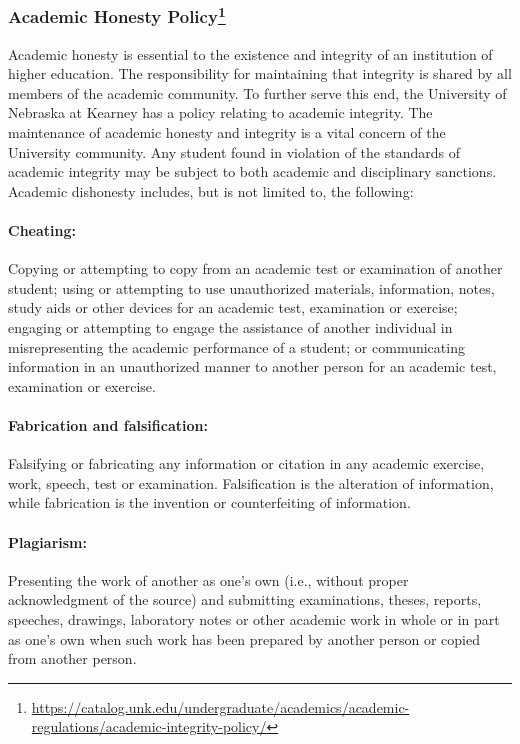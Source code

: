 \documentclass[12pt,fullpage]{article}
\newcounter{ex}\setcounter{ex}{0}
\begin{document}
\subsubsection*{Academic Honesty Policy\footnote{\url{https://catalog.unk.edu/undergraduate/academics/academic-regulations/academic-integrity-policy/}}}

Academic honesty is essential to the 
existence and integrity of an institution of higher education. The
responsibility for maintaining that integrity is shared by all members of the academic community. To
further serve this end, the University of Nebraska at Kearney has a policy relating to academic integrity.
The maintenance of academic honesty and integrity is a vital concern of the University community. Any
student found in violation of the standards of academic integrity may be subject to both academic and
disciplinary sanctions. Academic dishonesty includes, but is not limited to, the following:

\paragraph{Cheating:} Copying or attempting to copy from an academic test or examination of another student; using
or attempting to use unauthorized materials, information, notes, study aids or other devices for an academic
test, examination or exercise; engaging or attempting to engage the assistance of another individual in
misrepresenting the academic performance of a student; or communicating information in an unauthorized
manner to another person for an academic test, examination or exercise.

\paragraph{Fabrication and falsification:} Falsifying or fabricating any information or citation in any academic exercise,
work, speech, test or examination. Falsification is the alteration of information, while fabrication is the
invention or counterfeiting of information.

\paragraph{Plagiarism:} Presenting the work of another as one's own (i.e., without proper acknowledgment of the source)
and submitting examinations, theses, reports, speeches, drawings, laboratory notes or other academic work
in whole or in part as one's own when such work has been prepared by another person or copied from another
person.
\end{document}
